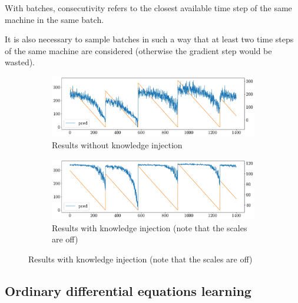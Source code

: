 \begin{description}
\begin{example}
            \indenttbox
            \begin{remark}
                With batches, consecutivity refers to the closest available time step  of the same machine in the same batch.

                It is also necessary to sample batches in such a way that at least two time steps of the same machine are considered (otherwise the gradient step would be wasted).
            \end{remark}

            \begin{figure}[H]
                \centering
                \begin{subfigure}{0.6\linewidth}
                    \centering
                    \includegraphics[width=\linewidth]{./img/_rul_pre_lagrangian.pdf}
                    \caption{Results without knowledge injection}
                \end{subfigure}
                \begin{subfigure}{0.6\linewidth}
                    \centering
                    \includegraphics[width=\linewidth]{./img/_rul_lagrangian.pdf}
                    \caption{Results with knowledge injection (note that the scales are off)}
                \end{subfigure}
            \end{figure}
        \end{example}
\end{description}


\subsection{Ordinary differential equations learning}

